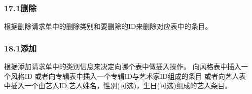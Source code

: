 \subsubsection{17.1删除}

根据删除请求单中的删除类别和要删除的ID来删除对应表中的条目。

\subsubsection{18.1添加}

根据添加请求单中的类别信息来决定向哪个表中做插入操作。
向风格表中插入一个风格ID
或者向专辑表中插入一个专辑ID与艺术家ID组成的条目
或者向艺人表中插入一个由艺人ID,艺人姓名，性别(可选)，生日(可选)组成的艺人条目。





